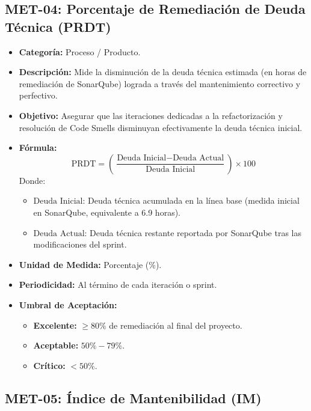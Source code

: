 \documentclass[12pt]{article}
\begin{document}
\subsection{MET-04: Porcentaje de Remediación de Deuda Técnica (PRDT)}
\label{subsec:met04}

\begin{itemize}
    \item \textbf{Categoría:} Proceso / Producto.
    \item \textbf{Descripción:} Mide la disminución de la deuda técnica estimada (en horas de remediación de SonarQube) lograda a través del mantenimiento correctivo y perfectivo.
    \item \textbf{Objetivo:} Asegurar que las iteraciones dedicadas a la refactorización y resolución de Code Smells disminuyan efectivamente la deuda técnica inicial.
    \item \textbf{Fórmula:}
    \begin{equation}
        \text{PRDT} = \left( \frac{\text{Deuda Inicial} - \text{Deuda Actual}}{\text{Deuda Inicial}} \right) \times 100
    \end{equation}
    Donde:
    \begin{itemize}
        \item $\text{Deuda Inicial}$: Deuda técnica acumulada en la línea base (medida inicial en SonarQube, equivalente a 6.9 horas).
        \item $\text{Deuda Actual}$: Deuda técnica restante reportada por SonarQube tras las modificaciones del sprint.
    \end{itemize}
    \item \textbf{Unidad de Medida:} Porcentaje (\%).
    \item \textbf{Periodicidad:} Al término de cada iteración o sprint.
    \item \textbf{Umbral de Aceptación:} 
    \begin{itemize}
        \item \textcolor{process}{\textbf{Excelente:}} $\ge 80\%$ de remediación al final del proyecto.
        \item \textcolor{value}{\textbf{Aceptable:}} $50\% - 79\%$.
        \item \textcolor{accentred}{\textbf{Crítico:}} $< 50\%$.
    \end{itemize}
\end{itemize}

\newpage

\subsection{MET-05: Índice de Mantenibilidad (IM)}
\label{subsec:met05}
\end{document}
